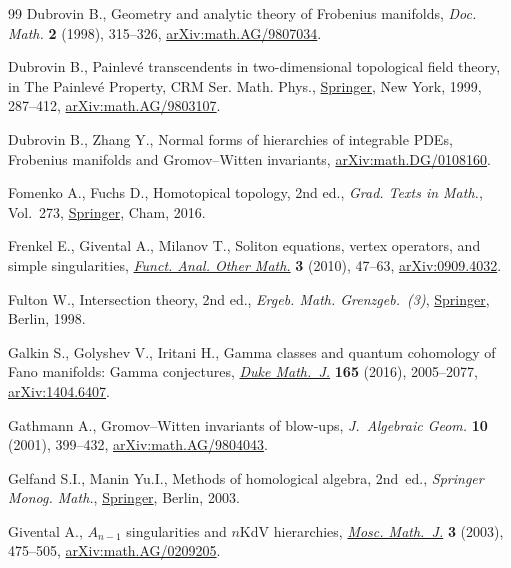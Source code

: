 \documentclass[pdftex]{sigma}
\numberwithin{equation}{section}
\begin{document}
\begin{thebibliography}{99}
Dubrovin B., Geometry and analytic theory of {F}robenius manifolds,
 \textit{Doc. Math.} \textbf{2} (1998), 315--326, \href{https://arxiv.org/abs/math.AG/9807034}{arXiv:math.AG/9807034}.

Dubrovin B., Painlev\'e transcendents in two-dimensional topological field
 theory, in The {P}ainlev\'e {P}roperty, CRM Ser. Math. Phys., \href{https://doi.org/10.1007/978-1-4612-1532-5_6}{Springer}, New
 York, 1999, 287--412, \href{https://arxiv.org/abs/math.AG/9803107}{arXiv:math.AG/9803107}.

Dubrovin B., Zhang Y., Normal forms of hierarchies of integrable {PDE}s,
 {F}robenius manifolds and {G}romov--{W}itten invariants,
 \href{https://arxiv.org/abs/math.DG/0108160}{arXiv:math.DG/0108160}.

Fomenko A., Fuchs D., Homotopical topology, 2nd ed., \textit{Grad. Texts in Math.}, Vol.~273, \href{https://doi.org/10.1007/978-3-319-23488-5}{Springer}, Cham, 2016.

Frenkel E., Givental A., Milanov T., Soliton equations, vertex operators, and
 simple singularities, \href{https://doi.org/10.1007/s11853-010-0035-6}{\textit{Funct. Anal. Other Math.}} \textbf{3} (2010),
 47--63, \href{https://arxiv.org/abs/0909.4032}{arXiv:0909.4032}.

Fulton W., Intersection theory, 2nd ed., \textit{Ergeb. Math. Grenzgeb.~(3)}, \href{https://doi.org/10.1007/978-1-4612-1700-8}{Springer},
 Berlin, 1998.

Galkin S., Golyshev V., Iritani H., Gamma classes and quantum cohomology of
 {F}ano manifolds: {G}amma conjectures, \href{https://doi.org/10.1215/00127094-3476593}{\textit{Duke Math.~J.}} \textbf{165}
 (2016), 2005--2077, \href{https://arxiv.org/abs/1404.6407}{arXiv:1404.6407}.

Gathmann A., Gromov--{W}itten invariants of blow-ups, \textit{J.~Algebraic
 Geom.} \textbf{10} (2001), 399--432, \href{https://arxiv.org/abs/math.AG/9804043}{arXiv:math.AG/9804043}.

Gelfand S.I., Manin Yu.I., Methods of homological algebra, 2nd~ed., \textit{Springer
 Monog. Math.}, \href{https://doi.org/10.1007/978-3-662-12492-5}{Springer}, Berlin, 2003.

Givental A., {$A_{n-1}$} singularities and {$n$}{K}d{V} hierarchies,
 \href{https://doi.org/10.17323/1609-4514-2003-3-2-475-505}{\textit{Mosc. Math.~J.}} \textbf{3} (2003), 475--505,
 \href{https://arxiv.org/abs/math.AG/0209205}{arXiv:math.AG/0209205}.


\end{thebibliography}
\end{document}

